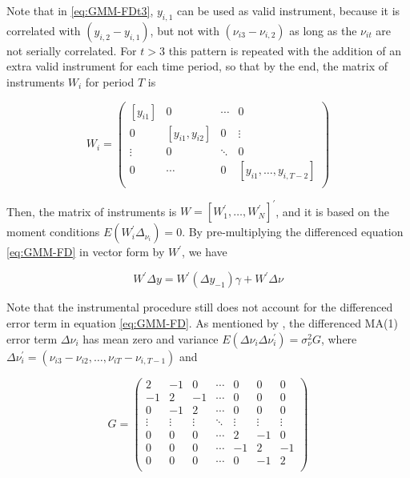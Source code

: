 \documentclass[a4paper, 12pt]{article}
\begin{document}
Note that in \eqref{eq:GMM-FDt3}, $y_{i,1}$ can be used as valid instrument, because it is correlated with $(y_{i,2} - y_{i,1})$, but not with $(\nu_{i3} - \nu_{i,2})$ as long as the $\nu_{it}$ are not serially correlated. For $t>3$ this pattern is repeated with the addition of an extra valid instrument for each time period, so that by the end, the matrix of instruments $W_i$ for period $T$ is


\begin{equation} \label{eq:GMM-Matrix}
W_i = \left( \begin{array}{cccc}
[y_{i1}] & 0 & \cdots & 0 \\
0 & [y_{i1}, y_{i2}] & 0 & \vdots \\
\vdots & 0 & \ddots & 0 \\
0 & \cdots & 0 & [y_{i1}, \dotsc, y_{i,T-2}] \\
\end{array}\right)
\end{equation}

Then, the matrix of instruments is $W=[W_1^{\prime}, \dotsc, W_N^{\prime}]^{\prime}$, and it is based on the moment conditions $E(W_i^{\prime} \Delta_{\nu_i})=0$. By pre-multiplying the differenced equation \eqref{eq:GMM-FD} in vector form by $W^{\prime}$, we have

\vspace{-5pt}
\begin{equation} \label{eq:GMM-Vector}
W^{\prime} \Delta y = W^{\prime} (\Delta y_{-1})\gamma + W^{\prime} \Delta \nu
\end{equation}


Note that the instrumental procedure still does not account for the differenced error term in equation \eqref{eq:GMM-FD}. As mentioned by \citet{habimana2017flexible}, the differenced MA(1) error term $\Delta \nu_i$ has mean zero and variance $E(\Delta \nu_i \Delta \nu_i^{\prime})= \sigma^2_{\nu} G$, where $\Delta \nu_i^{\prime} = (\nu_{i3} - \nu_{i2}, \dotsc, \nu_{iT} - \nu_{i,T-1})$ and


\begin{equation} \label{eq:GMM-Matrix}
G = \left( \begin{array}{ccccccc}
2 & -1 & 0 & \cdots & 0 & 0 & 0 \\
-1 & 2 & -1 & \cdots & 0 & 0 & 0 \\
0 & -1 & 2 & \cdots & 0 & 0 & 0 \\
\vdots & \vdots  & \vdots & \ddots & \vdots & \vdots & \vdots \\
0 & 0  & 0  & \cdots & 2 & -1 & 0 \\
0 & 0  & 0  & \cdots & -1 & 2 & -1 \\
0 & 0  & 0  & \cdots & 0 & -1 & 2 \\
\end{array}\right)
\end{equation}
\end{document}
